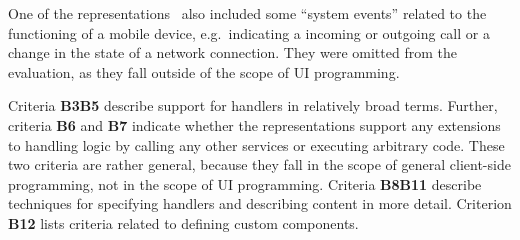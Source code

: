 One of the representations~\cite{Gaouar2018} also included some \enquote{system events} related to the functioning of a mobile device, e.g.\ indicating a incoming or outgoing call or a change in the state of a network connection.
They were omitted from the evaluation, as they fall outside of the scope of UI programming.

Criteria \textbf{B3}\textendash\textbf{B5} describe support for handlers in relatively broad terms.
Further, criteria \textbf{B6} and \textbf{B7} indicate whether the representations support any extensions to handling logic by calling any other services or executing arbitrary code.
These two criteria are rather general, because they fall in the scope of general client-side programming, not in the scope of UI programming.
Criteria \textbf{B8}\textendash\textbf{B11} describe techniques for specifying handlers and describing content in more detail.
Criterion \textbf{B12} lists criteria related to defining custom components.

